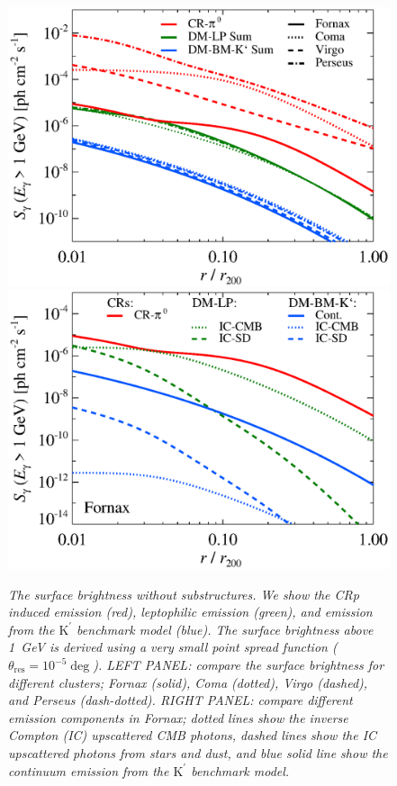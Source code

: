 \documentclass[10pt,aps,pra,reprint,amsmath,amsfonts,amssymb,showpacs]{revtex4-1}
\newcommand{\rmn}{\mathrm}
\newcommand{\psf}{\theta_\rmn{res}}
\newcommand{\Kp}{\rmn{K}^\prime}
\begin{document}
\begin{figure}
\begin{minipage}{2.0\columnwidth}
  \includegraphics[width=0.49\columnwidth]{figures/SB.v10.1GeV.SF300.noSuB.elmu.eps}
  \includegraphics[width=0.49\columnwidth]{figures/SB.fornax.v10.1GeV.SF300.noSuB.elmu.eps}
\caption{\it The surface brightness without substructures. We show the
  CRp induced emission (red), leptophilic emission (green), and
  emission from the $\Kp$ benchmark model (blue). The surface
  brightness above 1~GeV is derived using a very small point spread
  function ($\psf=10^{-5}\deg$). LEFT PANEL: compare the
  surface brightness for different clusters; Fornax (solid), Coma
  (dotted), Virgo (dashed), and Perseus (dash-dotted). RIGHT PANEL:
  compare different emission components in Fornax; dotted lines show
  the inverse Compton (IC) upscattered CMB photons, dashed lines show
  the IC upscattered photons from stars and dust, and blue solid line
  show the continuum emission from the $\Kp$ benchmark
  model.}
 \label{fig:SB_clu_nosub}
\end{minipage}
\end{figure}
\end{document}
